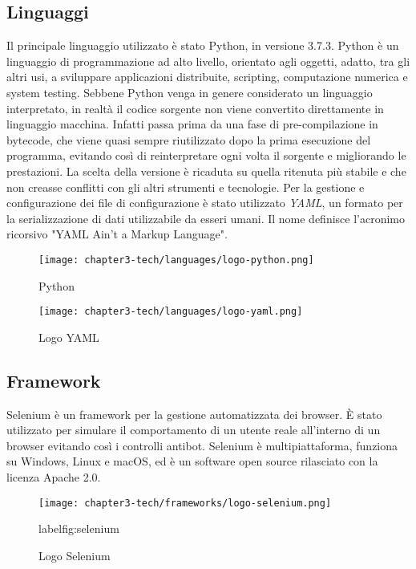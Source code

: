 \subsection{Linguaggi}
Il principale linguaggio utilizzato è stato Python, in versione 3.7.3. Python è un linguaggio di programmazione ad alto livello, orientato agli oggetti, adatto, tra gli altri usi, a sviluppare applicazioni distribuite, scripting, computazione numerica e system testing. Sebbene Python venga in genere considerato un linguaggio interpretato, in realtà il codice sorgente non viene convertito direttamente in linguaggio macchina. Infatti passa prima da una fase di pre-compilazione in bytecode, che viene quasi sempre riutilizzato dopo la prima esecuzione del programma, evitando così di reinterpretare ogni volta il sorgente e migliorando le prestazioni. La scelta della versione è ricaduta su quella ritenuta più stabile e che non creasse conflitti con gli altri strumenti e tecnologie.\newline{}
Per la gestione e configurazione dei file di configurazione è stato utilizzato \textit{YAML}, un formato per la serializzazione di dati utilizzabile da esseri umani. Il nome definisce l'acronimo ricorsivo "YAML Ain't a Markup Language".
\begin{figure}[!h]
    \begin{minipage}{.5\textwidth} 
        \centering 
        \texttt{[image: chapter3-tech/languages/logo-python.png]} 
        \caption{Python} 
        \label{fig:python} 
    \end{minipage}%
    \begin{minipage}{.5\textwidth} 
        \centering 
        \texttt{[image: chapter3-tech/languages/logo-yaml.png]} 
        \caption{Logo YAML} 
        \label{fig:yaml} 
    \end{minipage}%
\end{figure}
\subsection{Framework}
Selenium è un framework per la gestione automatizzata dei browser. È stato utilizzato per simulare il comportamento di un utente reale all'interno di un browser evitando così i controlli antibot. Selenium è multipiattaforma, funziona su Windows, Linux e macOS, ed è un software open source rilasciato con la licenza Apache 2.0.
\begin{figure}[!h] 
    \centering 
    \texttt{[image: chapter3-tech/frameworks/logo-selenium.png]} 
    \caption{Logo Selenium}
    label{fig:selenium} 
\end{figure}

